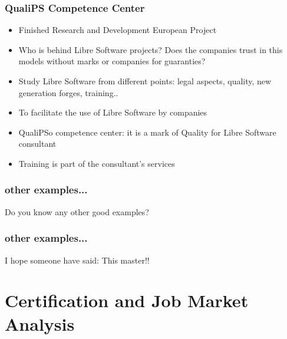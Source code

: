 \documentclass{beamer}
\begin{document}

\begin{frame}
\frametitle{QualiPS Competence Center}
\begin{itemize}
\item Finished Research and Development  European Project
\item Who is behind Libre Software projects? Does the companies trust in this models without marks or companies for guaranties? 
\item Study Libre Software from different points: legal aspects, quality, new generation forges, training..
\item To facilitate the use of Libre Software by companies
\item QualiPSo competence center: it is a mark of Quality for Libre Software consultant 
\item Training is part of the consultant's services
\end{itemize}
\end{frame}

\begin{frame}
\frametitle{other examples...}
\begin{center}
\huge{Do you know any other good examples?}
\end{center}
\end{frame}


\begin{frame}
\frametitle{other examples...}
\begin{center}
\huge{I hope someone have said: This master!!}
\end{center}
\end{frame}





\section{Certification and Job Market Analysis}

\end{document}

